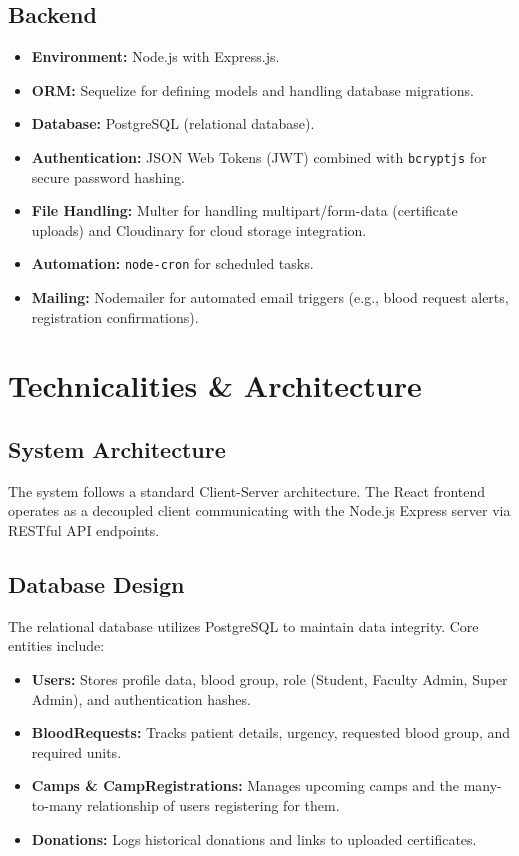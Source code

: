 \documentclass[12pt, a4paper]{article}
\begin{document}
\subsection{Backend}
\begin{itemize}
    \item \textbf{Environment:} Node.js with Express.js.
    \item \textbf{ORM:} Sequelize for defining models and handling database migrations.
    \item \textbf{Database:} PostgreSQL (relational database).
    \item \textbf{Authentication:} JSON Web Tokens (JWT) combined with \texttt{bcryptjs} for secure password hashing.
    \item \textbf{File Handling:} Multer for handling multipart/form-data (certificate uploads) and Cloudinary for cloud storage integration.
    \item \textbf{Automation:} \texttt{node-cron} for scheduled tasks.
    \item \textbf{Mailing:} Nodemailer for automated email triggers (e.g., blood request alerts, registration confirmations).
\end{itemize}

\section{Technicalities \& Architecture}
\subsection{System Architecture}
The system follows a standard Client-Server architecture. The React frontend operates as a decoupled client communicating with the Node.js Express server via RESTful API endpoints. 

\subsection{Database Design}
The relational database utilizes PostgreSQL to maintain data integrity. Core entities include:
\begin{itemize}
    \item \textbf{Users:} Stores profile data, blood group, role (Student, Faculty Admin, Super Admin), and authentication hashes.
    \item \textbf{BloodRequests:} Tracks patient details, urgency, requested blood group, and required units.
    \item \textbf{Camps \& CampRegistrations:} Manages upcoming camps and the many-to-many relationship of users registering for them.
    \item \textbf{Donations:} Logs historical donations and links to uploaded certificates.
\end{itemize}
\end{document}
